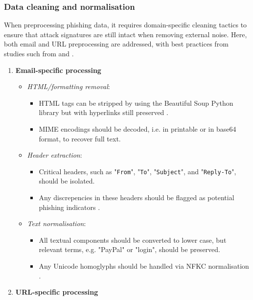 
\subsubsection*{Data cleaning and normalisation}
When preprocessing phishing data, it requires domain-specific cleaning tactics to ensure that attack signatures are still intact when removing external noise. Here, both email and URL preprocessing are addressed, with best practices from studies such from \cite{zamir2020phishing} and \cite{ahmad2024across}.

\begin{enumerate}
  \item \textbf{Email-specific processing}
  \begin{itemize}
    \item \textit{HTML/formatting removal}:
    \begin{itemize}
      \item HTML tags can be stripped by using the Beautiful Soup Python library \cite{beautifulsoup2025} but with hyperlinks still preserved \citep{bravo2010bridging}.
      \item MIME encodings should be decoded, i.e. in printable or in base64 format, to recover full text.
    \end{itemize}
    \item \textit{Header extraction}:
    \begin{itemize}
      \item Critical headers, such as "\texttt{From}", "\texttt{To}", "\texttt{Subject}", and "\texttt{Reply-To}", should be isolated.
      \item Any discrepencies in these headers should be flagged as potential phishing indicators \citep{lin2021phishpedia}.
    \end{itemize}
    \item \textit{Text normalisation}:
    \begin{itemize}
      \item All textual components should be converted to lower case, but relevant terms, e.g. "PayPal" or "login", should be preserved.
      \item Any Unicode homoglyphs should be handled via NFKC normalisation \citep{andriu2023adaptive}.
    \end{itemize}
  \end{itemize}
  \item \textbf{URL-specific processing}

\end{enumerate}
